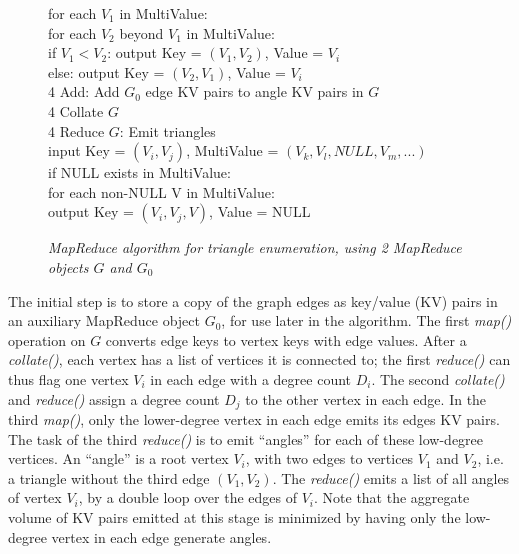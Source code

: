 \begin{figure}[htb]
\begin{center}
{\begin{minipage}{\textwidth}
\begin{tabbing}
	      \> \> for each $V_1$ in MultiValue: \\
	      \> \> \> for each $V_2$ beyond $V_1$ in MultiValue: \\
	      \> \> \> \> if $V_1 < V_2$: output Key = $(V_1,V_2)$, Value = $V_i$ \\
	      \> \> \> \> else: output Key = $(V_2,V_1)$, Value = $V_i$ \\
4 Add: \> Add $G_0$ edge KV pairs to angle KV pairs in $G$ \\
4 Collate $G$ \\
4 Reduce $G$: \> Emit triangles \\
              \> \> input Key = $(V_i,V_j)$, MultiValue = $(V_k,V_l,NULL,V_m,...)$ \\
              \> \> if NULL exists in MultiValue: \\
	      \> \> \> for each non-NULL V in MultiValue: \\
	      \> \> \> \> output Key = $(V_i,V_j,V)$, Value = NULL

  \end{tabbing}
 \end{minipage}}\end{center}

 \caption{\it MapReduce algorithm for triangle enumeration, using 2 MapReduce objects $G$ and $G_0$}

 \label{fig:tri}
\end{figure}

The initial step is to store a copy of the graph edges as key/value
(KV) pairs in an auxiliary MapReduce object $G_0$, for use later in
the algorithm.  The first {\it map()} operation on $G$ converts edge
keys to vertex keys with edge values.  After a {\it collate()}, each
vertex has a list of vertices it is connected to; the first {\it
reduce()} can thus flag one vertex $V_i$ in each edge with a degree
count $D_i$.  The second {\it collate()} and {\it reduce()} assign a
degree count $D_j$ to the other vertex in each edge.  In the third
{\it map()}, only the lower-degree vertex in each edge emits its edges
KV pairs.  The task of the third {\it reduce()} is to emit ``angles''
for each of these low-degree vertices.  An ``angle'' is a root vertex
$V_i$, with two edges to vertices $V_1$ and $V_2$, i.e. a triangle
without the third edge $(V_1,V_2)$.  The {\it reduce()} emits a list
of all angles of vertex $V_i$, by a double loop over the edges of
$V_i$.  Note that the aggregate volume of KV pairs emitted at this
stage is minimized by having only the low-degree vertex in each edge
generate angles.

